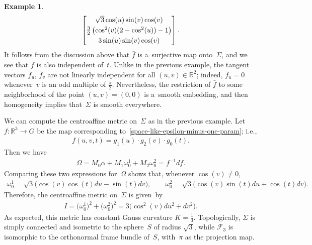 \documentclass[10pt,a4paper]{amsart}
\numberwithin{equation}{section}
\theoremstyle{definition}
\newtheorem{exmpl}[teo]{Example}
\begin{document}
\begin{exmpl}
\begin{gather}
\begin{bmatrix}
\sqrt{3} \cos(u) \sin(v) \cos(v)
\vspace{1mm}\\
\tfrac{3}{2}\left(\cos^2(v) (2 - \cos^2(u)) - 1 \right)
\vspace{1mm}\\
3 \sin(u) \sin(v) \cos(v)
\end{bmatrix}.
\label{space-like-epsilon-minus-one-param}
\end{gather}
It follows from the discussion above that $\bar{f}$ is a~surjective map onto~$\Sigma$, and we see that $\bar{f}$ is also
independent of~$t$.
Unlike in the previous example, the tangent vectors $\bar{f}_u$, $\bar{f}_v$ are not linearly independent for all $(u,v)
\in \mathbb{R}^2$; indeed, $\bar{f}_u=0$ whenever~$v$ is an odd multiple of $\frac{\pi}{2}$.
Nevertheless, the restriction of $\bar{f}$ to some neighborhood of the point $(u,v) = (0,0)$ is a~smooth embedding, and
then homogeneity implies that~$\Sigma$ is smooth everywhere.

We can compute the centroaf\/f\/ine metric on~$\Sigma$ as in the previous example.
Let $f:\mathbb{R}^3 \to G$ be the map corresponding to~\eqref{space-like-epsilon-minus-one-param}; i.e.,
\begin{gather*}
f(u,v,t) = g_1(u) \cdot g_2(v) \cdot g_0(t).
\end{gather*}
Then we have
\begin{gather*}
\Omega = M_0  \alpha + M_1  \omega^1_0 + M_2  \omega^2_0 = f^{-1}  d f.
\end{gather*}
Comparing these two expressions for~$\Omega$ shows that, whenever $\cos(v) \neq 0$,
\begin{gather*}
\omega^1_0 = \sqrt{3}\big(\cos (v) \cos(t)  du - \sin(t) dv \big),
\qquad
\omega^2_0 = \sqrt{3}\big(\cos (v) \sin(t)   du + \cos(t)  dv \big).
\end{gather*}
Therefore, the centroaf\/f\/ine metric on~$\Sigma$ is given~by
\begin{gather*}
I = \big(\omega^1_0\big)^2 + \big(\omega^2_0\big)^2 = 3\big(\cos^2(v)  du^2 + dv^2\big).
\end{gather*}
As expected, this metric has constant Gauss curvature $K = \frac{1}{3}$.
Topologically, $\Sigma$ is simply connected and isometric to the sphere~$S$ of radius $\sqrt{3}$, while $\mathcal{F}_3$
is isomorphic to the orthonormal frame bundle of~$S$, with~$\pi$ as the projection map.


\end{exmpl}
\end{document}
